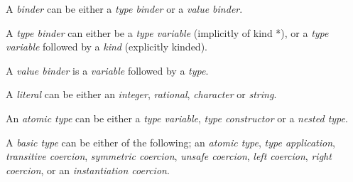 
A \emph{binder} can be either a \emph{type binder} or a \emph{value binder}. 


A \emph{type binder} can either be a \emph{type variable} (implicitly of kind *), or a 
\emph{type variable} followed by a \emph{kind} (explicitly kinded).


A \emph{value binder} is a \emph{variable} followed by a \emph{type}.



A \emph{literal} can be either an \emph{integer}, \emph{rational}, \emph{character} 
or \emph{string}.


An \emph{atomic type} can be either a \emph{type variable}, \emph{type constructor} 
or a \emph{nested type}.


A \emph{basic type} can be either of the following; an \emph{atomic type}, 
\emph{type application}, \emph{transitive coercion}, \emph{symmetric coercion},
\emph{unsafe coercion}, \emph{left coercion}, \emph{right coercion}, or an
\emph{instantiation coercion}.


